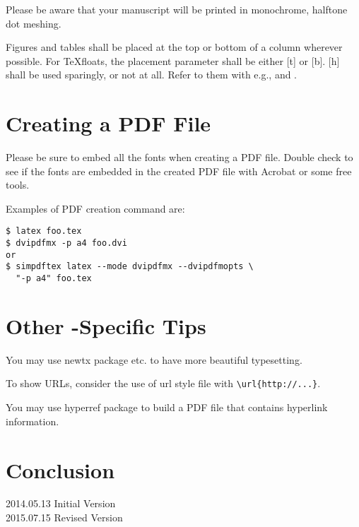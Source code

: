 \documentclass[10pt]{article}
\begin{document}
Please be aware that your manuscript will be printed in monochrome, 
halftone dot meshing.

Figures and tables shall be placed at the top or bottom of a column wherever possible.
For \TeX floats, the placement parameter shall be either [t] or [b]. [h] shall be 
used sparingly, or not at all.
Refer to them with e.g., 
 and .

\vspace{5cm}

\section{Creating a PDF File}
Please be sure to embed all the fonts when creating a PDF file.
Double check to see if the fonts are embedded in the created PDF file 
with Acrobat or some free tools.

Examples of PDF creation command are:
\begin{verbatim}
$ latex foo.tex
$ dvipdfmx -p a4 foo.dvi
or
$ simpdftex latex --mode dvipdfmx --dvipdfmopts \
  "-p a4" foo.tex
\end{verbatim}

\vspace{5cm}

\section{Other \LaTeXe-Specific Tips}

You may use newtx\cite{newtx} package etc. to have more beautiful typesetting.


To show URLs, consider the use of url style file with \verb|\url{http://...}|.

You may use 
hyperref package\cite{hyperref} to 
build a PDF file that contains hyperlink information. 

\vspace{5cm}

\section{Conclusion}
2014.05.13 Initial Version\\
2015.07.15 Revised Version
\end{document}
